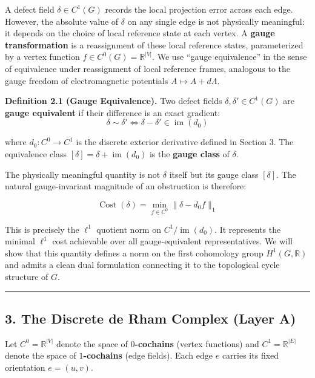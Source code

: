 \documentclass[
]{article}
\begin{document}
A defect field \(\delta \in C^1(G)\) records the local projection error
across each edge. However, the absolute value of \(\delta\) on any
single edge is not physically meaningful: it depends on the choice of
local reference state at each vertex. A \textbf{gauge transformation} is
a reassignment of these local reference states, parameterized by a
vertex function \(f \in C^0(G) = \mathbb{R}^{|V|}\). We use ``gauge
equivalence'' in the sense of equivalence under reassignment of local
reference frames, analogous to the gauge freedom of electromagnetic
potentials \(A \mapsto A + d\Lambda\).

\textbf{Definition 2.1 (Gauge Equivalence).} Two defect fields
\(\delta, \delta' \in C^1(G)\) are \textbf{gauge equivalent} if their
difference is an exact gradient:
\[ \delta \sim \delta' \iff \delta - \delta' \in \operatorname{im}(d_0) \]

where \(d_0 : C^0 \to C^1\) is the discrete exterior derivative defined
in Section 3. The equivalence class
\([\delta] = \delta + \operatorname{im}(d_0)\) is the \textbf{gauge
class} of \(\delta\).

The physically meaningful quantity is not \(\delta\) itself but its
gauge class \([\delta]\). The natural gauge-invariant magnitude of an
obstruction is therefore:

\[ \operatorname{Cost}(\delta) = \min_{f \in C^0} \|\delta - d_0 f\|_1 \]

This is precisely the \(\ell^1\) quotient norm on
\(C^1 / \operatorname{im}(d_0)\). It represents the minimal \(\ell^1\)
cost achievable over all gauge-equivalent representatives. We will show
that this quantity defines a norm on the first cohomology group
\(H^1(G, \mathbb{R})\) and admits a clean dual formulation connecting it
to the topological cycle structure of \(G\).

\begin{center}\rule{0.5\linewidth}{0.5pt}\end{center}

\subsection{\texorpdfstring{3. The Discrete de Rham Complex
\textbf{(Layer
A)}}{3. The Discrete de Rham Complex (Layer A)}}\label{the-discrete-de-rham-complex-layer-a}

Let \(C^0 = \mathbb{R}^{|V|}\) denote the space of
\textbf{\(0\)-cochains} (vertex functions) and
\(C^1 = \mathbb{R}^{|E|}\) denote the space of \textbf{\(1\)-cochains}
(edge fields). Each edge \(e\) carries its fixed orientation
\(e = (u,v)\).
\end{document}
